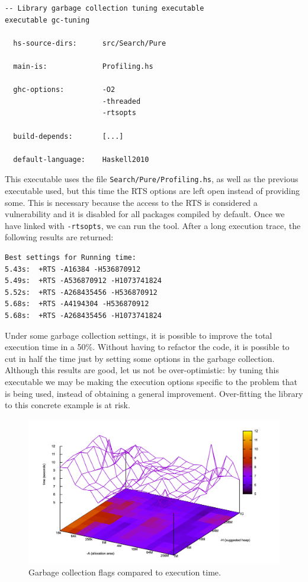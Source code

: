 \begin{lstlisting}[style=haskell, label=gc-cabal, caption=
Setup for the \texttt{gc-tuning} executable in the Cabal file]
-- Library garbage collection tuning executable
executable gc-tuning

  hs-source-dirs:      src/Search/Pure
           
  main-is:             Profiling.hs
  
  ghc-options:         -O2
                       -threaded
                       -rtsopts

  build-depends:       [...]

  default-language:    Haskell2010
\end{lstlisting}

This executable uses the file \texttt{Search/Pure/Profiling.hs}, as well as the
previous executable used, but this time the RTS options are left open instead
of providing some. This is necessary because the access to the RTS is
considered a vulnerability and it is disabled for all packages compiled by
default. Once we have linked with \texttt{-rtsopts}, we can run the tool. After
a long execution trace, the following results are returned:\\

\begin{lstlisting}
Best settings for Running time:
5.43s:  +RTS -A16384 -H536870912
5.49s:  +RTS -A536870912 -H1073741824
5.52s:  +RTS -A268435456 -H536870912
5.68s:  +RTS -A4194304 -H536870912
5.68s:  +RTS -A268435456 -H1073741824
\end{lstlisting}

Under some garbage collection settings, it is possible to improve the total
execution time in a 50\%. Without having to refactor the code, it is possible
to cut in half the time just by setting some options in the garbage collection.
Although this results are good, let us not be over-optimistic: by tuning this
executable we may be making the execution options specific to the problem that
is being used, instead of obtaining a general improvement. Over-fitting the
library to this concrete example is at risk.\\

\begin{figure}[ht]
\centering
\includegraphics[width=\textwidth]{img/gc-tuning.png}
\caption{Garbage collection flags compared to execution time.}
\label{gc-tuning}
\end{figure}

